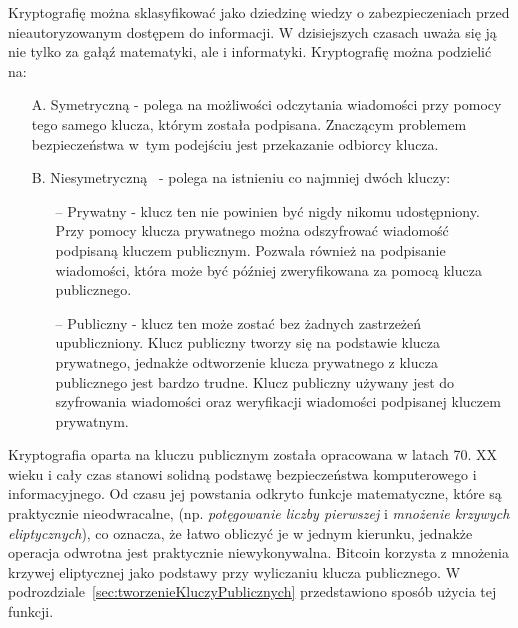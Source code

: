 \documentclass[12pt, oneside, final, openany]{mgr}
\begin{document}
\indent Kryptografię można sklasyfikować jako dziedzinę wiedzy o zabezpieczeniach przed nieautoryzowanym dostępem do informacji. W dzisiejszych czasach uważa się ją nie tylko za gałąź matematyki, ale i informatyki. Kryptografię można podzielić na:
\begin{itemize}
\item[A.] Symetryczną - polega na możliwości odczytania wiadomości przy pomocy tego samego klucza, którym została podpisana. Znaczącym problemem bezpieczeństwa w~tym podejściu jest przekazanie odbiorcy klucza. 
\item[B.] Niesymetryczną~\cite{CryptoDenga, asynchModel} - polega na istnieniu co najmniej dwóch kluczy:
\begin{itemize}
\item[--] Prywatny - klucz ten nie powinien być nigdy nikomu udostępniony. Przy pomocy klucza prywatnego można odszyfrować wiadomość podpisaną kluczem publicznym. Pozwala również na podpisanie wiadomości, która może być później zweryfikowana za pomocą klucza publicznego.
\item[--] Publiczny - klucz ten może zostać bez żadnych zastrzeżeń upubliczniony. Klucz publiczny tworzy się na podstawie klucza prywatnego, jednakże odtworzenie klucza prywatnego z klucza publicznego jest bardzo trudne. Klucz publiczny używany jest do szyfrowania wiadomości oraz weryfikacji wiadomości podpisanej kluczem prywatnym.
\end{itemize}
\end{itemize} 

\indent Kryptografia oparta na kluczu publicznym została opracowana w latach 70. XX wieku i cały czas stanowi solidną podstawę bezpieczeństwa komputerowego i informacyjnego. Od czasu jej powstania odkryto funkcje matematyczne, które są praktycznie nieodwracalne, (np. \textit{potęgowanie liczby pierwszej} i \textit{mnożenie krzywych eliptycznych}), co oznacza, że łatwo obliczyć je w jednym kierunku, jednakże operacja odwrotna jest praktycznie niewykonywalna. Bitcoin korzysta z mnożenia krzywej eliptycznej jako podstawy przy wyliczaniu klucza publicznego. W podrozdziale~\ref{sec:tworzenieKluczyPublicznych} przedstawiono sposób użycia tej funkcji.
\end{document}
